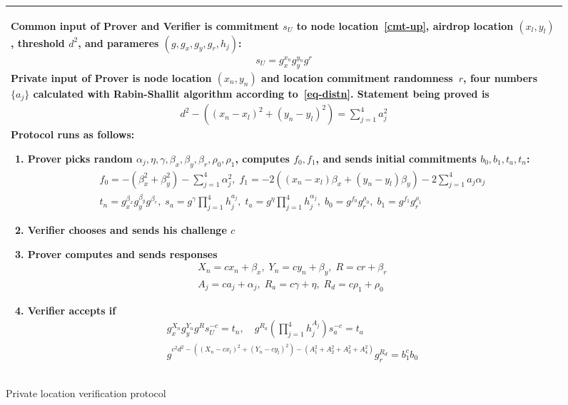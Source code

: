 \documentclass{llncs}
\begin{document}
\begin{figure}[!htb]
\begin{tabular}{|p{\linewidth}|}
\hline

Common input of Prover and Verifier is
  commitment $s_U$ to node location~\eqref{cmt-up},
  airdrop location $(x_l, y_l)$,
  threshold $d^2$,
  and parameres $(g, g_x, g_y, g_r, h_j)$:
\begin{gather}
\label{cmt-up}
  s_U = g_x^{x_n} g_y^{y_n} g^{r}
\end{gather}
Private input of Prover is
  node location $(x_n, y_n)$ and location commitment randomness~$r$,
  four numbers~$\{a_j\}$ calculated with Rabin-Shallit algorithm according to~\eqref{eq-distn}.
Statement being proved is
\begin{gather}
\label{eq-distn}
  d^2 - ((x_n - x_l)^2 + (y_n - y_l)^2) = \sum_{j=1}^4 a_j^2
\end{gather}
Protocol runs as follows:
\begin{enumerate}
\item
  Prover picks random $\alpha_j, \eta, \gamma, \beta_x, \beta_y, \beta_r, \rho_0, \rho_1$,
  computes $f_0, f_1$, and sends initial commitments $b_0, b_1, t_a, t_n$:
\begin{gather}
  f_0 = -(\beta_x^2 + \beta_y^2) - \sum_{j=1}^4 \alpha_j^2,   \;
  f_1 = -2( (x_n - x_l) \beta_x  + (y_n - y_l) \beta_y) -2 \sum_{j=1}^4 a_j \alpha_j   \\
%
  t_n = g_x^{\beta_x} g_y^{\beta_y} g^{\beta_r} ,   \;
  s_a = g^{\gamma} \prod_{j=1}^4 h_j^{a_j},   \;
  t_a = g^{\eta} \prod_{j=1}^4 h_j^{\alpha_j}, \;
  b_0 = g^{f_0} g_r^{\rho_0},  \;
  b_1 = g^{f_1} g_r^{\rho_1}
\end{gather}
%
\item
  Verifier chooses and sends his challenge $c$
\item
  Prover computes and sends responses
\begin{gather}
  X_n = c x_n + \beta_x,  \;
  Y_n = c y_n + \beta_y,  \;
  R = c r + \beta_r   \\
  A_j = c a_j + \alpha_j, \;
  R_a = c \gamma + \eta,   \;
  R_d = c \rho_1 + \rho_0
\end{gather}
%
\item
  Verifier accepts if
\begin{gather}
\label{verf-linear}
  g_x^{X_n} g_y^{Y_n} g^{R} s_U^{-c} = t_n, \quad
  g^{R_a} (\prod_{j=1}^4 h_j^{A_j}) s_a^{-c} = t_a \\
\label{verf-distn}
  g^{c^2 d^2 - ((X_n - c x_l)^2 + (Y_n - c y_l)^2) - (A_1^2 + A_2^2 + A_3^2 + A_4^2)} g_r^{R_d} = b_1^{c} b_0
\end{gather}
\end{enumerate}
\\
\hline
\end{tabular}
\caption{Private location verification protocol}
\label{fig}
\end{figure}
\end{document}

